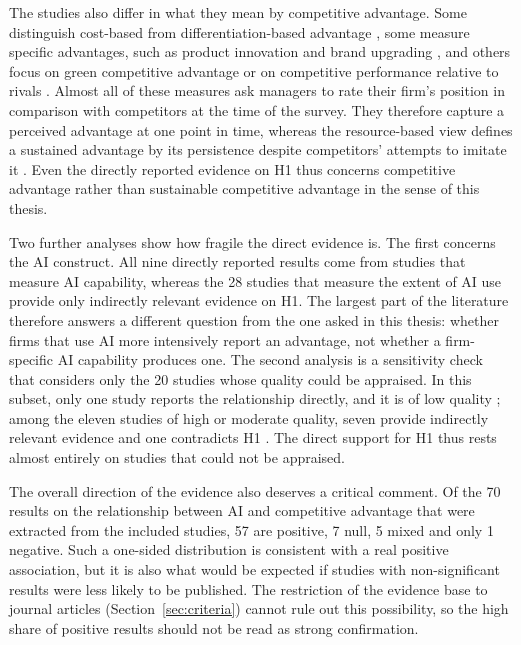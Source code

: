 The studies also differ in what they mean by competitive advantage. Some distinguish cost-based from differentiation-based advantage \parencite{almereb2026, kim2026}, some measure specific advantages, such as product innovation and brand upgrading \parencite{guo2025}, and others focus on green competitive advantage \parencite{waqas2024, chen2026} or on competitive performance relative to rivals \parencite{gafsi2026, wang2026}. Almost all of these measures ask managers to rate their firm's position in comparison with competitors at the time of the survey. They therefore capture a perceived advantage at one point in time, whereas the resource-based view defines a sustained advantage by its persistence despite competitors' attempts to imitate it \parencite{barney1991, peteraf1993}. Even the directly reported evidence on H1 thus concerns competitive advantage rather than sustainable competitive advantage in the sense of this thesis.

Two further analyses show how fragile the direct evidence is. The first concerns the AI construct. All nine directly reported results come from studies that measure AI capability, whereas the 28 studies that measure the extent of AI use provide only indirectly relevant evidence on H1. The largest part of the literature therefore answers a different question from the one asked in this thesis: whether firms that use AI more intensively report an advantage, not whether a firm-specific AI capability produces one. The second analysis is a sensitivity check that considers only the 20 studies whose quality could be appraised. In this subset, only one study reports the relationship directly, and it is of low quality \parencite{firmansyah2025}; among the eleven studies of high or moderate quality, seven provide indirectly relevant evidence and one contradicts H1 \parencite{wang2026}. The direct support for H1 thus rests almost entirely on studies that could not be appraised.

The overall direction of the evidence also deserves a critical comment. Of the 70 results on the relationship between AI and competitive advantage that were extracted from the included studies, 57 are positive, 7 null, 5 mixed and only 1 negative. Such a one-sided distribution is consistent with a real positive association, but it is also what would be expected if studies with non-significant results were less likely to be published. The restriction of the evidence base to journal articles (Section~\ref{sec:criteria}) cannot rule out this possibility, so the high share of positive results should not be read as strong confirmation.

